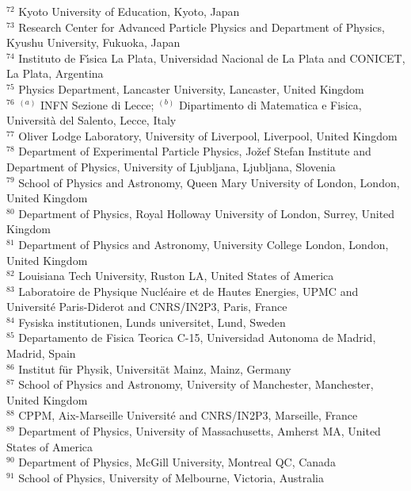 \begin{flushleft}
$^{72}$ Kyoto University of Education, Kyoto, Japan\\
$^{73}$ Research Center for Advanced Particle Physics and Department of Physics, Kyushu University, Fukuoka, Japan\\
$^{74}$ Instituto de F{\'\i}sica La Plata, Universidad Nacional de La Plata and CONICET, La Plata, Argentina\\
$^{75}$ Physics Department, Lancaster University, Lancaster, United Kingdom\\
$^{76}$ $^{(a)}$ INFN Sezione di Lecce; $^{(b)}$ Dipartimento di Matematica e Fisica, Universit{\`a} del Salento, Lecce, Italy\\
$^{77}$ Oliver Lodge Laboratory, University of Liverpool, Liverpool, United Kingdom\\
$^{78}$ Department of Experimental Particle Physics, Jo{\v{z}}ef Stefan Institute and Department of Physics, University of Ljubljana, Ljubljana, Slovenia\\
$^{79}$ School of Physics and Astronomy, Queen Mary University of London, London, United Kingdom\\
$^{80}$ Department of Physics, Royal Holloway University of London, Surrey, United Kingdom\\
$^{81}$ Department of Physics and Astronomy, University College London, London, United Kingdom\\
$^{82}$ Louisiana Tech University, Ruston LA, United States of America\\
$^{83}$ Laboratoire de Physique Nucl{\'e}aire et de Hautes Energies, UPMC and Universit{\'e} Paris-Diderot and CNRS/IN2P3, Paris, France\\
$^{84}$ Fysiska institutionen, Lunds universitet, Lund, Sweden\\
$^{85}$ Departamento de Fisica Teorica C-15, Universidad Autonoma de Madrid, Madrid, Spain\\
$^{86}$ Institut f{\"u}r Physik, Universit{\"a}t Mainz, Mainz, Germany\\
$^{87}$ School of Physics and Astronomy, University of Manchester, Manchester, United Kingdom\\
$^{88}$ CPPM, Aix-Marseille Universit{\'e} and CNRS/IN2P3, Marseille, France\\
$^{89}$ Department of Physics, University of Massachusetts, Amherst MA, United States of America\\
$^{90}$ Department of Physics, McGill University, Montreal QC, Canada\\
$^{91}$ School of Physics, University of Melbourne, Victoria, Australia\\

\end{flushleft}
